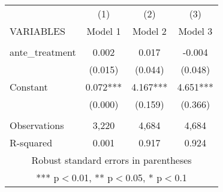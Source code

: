 \begin{tabular}{lccc} \hline
 & (1) & (2) & (3) \\
VARIABLES & Model 1 & Model 2 & Model 3 \\ \hline
 &  &  &  \\
ante\_treatment & 0.002 & 0.017 & -0.004 \\
 & (0.015) & (0.044) & (0.048) \\
Constant & 0.072*** & 4.167*** & 4.651*** \\
 & (0.000) & (0.159) & (0.366) \\
 &  &  &  \\
Observations & 3,220 & 4,684 & 4,684 \\
 R-squared & 0.001 & 0.917 & 0.924 \\ \hline
\multicolumn{4}{c}{ Robust standard errors in parentheses} \\
\multicolumn{4}{c}{ *** p$<$0.01, ** p$<$0.05, * p$<$0.1} \\
\end{tabular}
